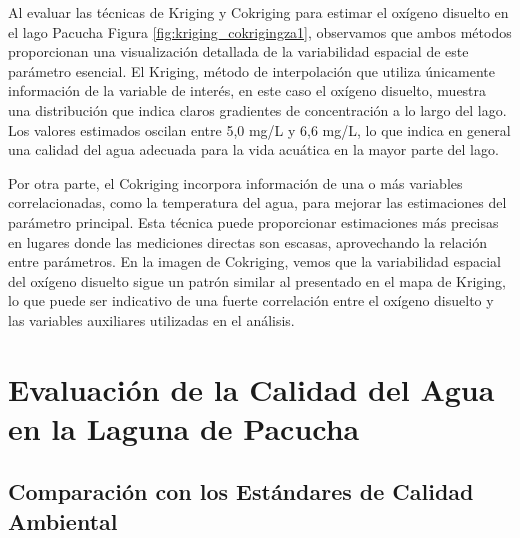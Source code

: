   Al evaluar las técnicas de Kriging y Cokriging para estimar el oxígeno disuelto en el lago Pacucha Figura \ref{fig:kriging_cokrigingza1}, observamos que ambos métodos proporcionan una visualización detallada de la variabilidad espacial de este parámetro esencial. El Kriging, método de interpolación que utiliza únicamente información de la variable de interés, en este caso el oxígeno disuelto, muestra una distribución que indica claros gradientes de concentración a lo largo del lago. Los valores estimados oscilan entre 5,0 mg/L y 6,6 mg/L, lo que indica en general una calidad del agua adecuada para la vida acuática en la mayor parte del lago.

Por otra parte, el Cokriging incorpora información de una o más variables correlacionadas, como la temperatura del agua, para mejorar las estimaciones del parámetro principal. Esta técnica puede proporcionar estimaciones más precisas en lugares donde las mediciones directas son escasas, aprovechando la relación entre parámetros. En la imagen de Cokriging, vemos que la variabilidad espacial del oxígeno disuelto sigue un patrón similar al presentado en el mapa de Kriging, lo que puede ser indicativo de una fuerte correlación entre el oxígeno disuelto y las variables auxiliares utilizadas en el análisis.


\section{Evaluación de la Calidad del Agua en la Laguna de Pacucha}

\subsection{Comparación con los Estándares de Calidad Ambiental}

